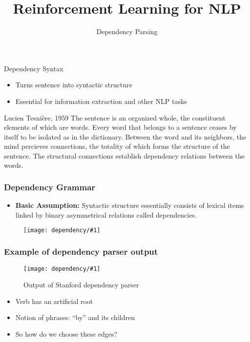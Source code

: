 \documentclass[compress]{beamer}
\title{Reinforcement Learning for NLP}
\date{Dependency Parsing}
\newcommand{\gfx}[2]{
\begin{center}
	\texttt{[image: dependency/\#1]}
\end{center}
}
\begin{document}


\begin{frame}{Dependency Syntax}

\begin{itemize}
  \item Turns sentence into syntactic structure
  \item Essential for information extraction and other NLP tasks
\end{itemize}

\begin{block}{Lucien Tesni\`ere, 1959}
The sentence is an organized whole, the constituent elements of which are words.  Every word that belongs to a sentence ceases by itself to be isolated as in the dictionary.  Between the word and its neighbors, the mind percieves connections, the totality of which forms the structure of the sentence.  The structural connections establish dependency relations between the words.
\end{block}

\end{frame}

\begin{frame}
\frametitle{Dependency Grammar}
\begin{itemize}

\item \textbf{Basic Assumption:} Syntactic structure essentially consists of lexical items linked by binary asymmetrical relations called dependencies.

\end{itemize}
\begin{figure}[h]
  \centering
  \gfx{ex1}{.8}
\end{figure}

\end{frame}


\begin{frame}
\frametitle{Example of dependency parser output}
\begin{figure}[h]
  \centering
  \gfx{ex2.pdf}{.8}
  \caption{Output of Stanford dependency parser}
\end{figure}
\pause
\begin{itemize}
  \item Verb has an artificial root
  \item Notion of phrases: ``by'' and its children
  \item So how do we choose these edges?
\end{itemize}
\end{frame}
\end{document}
